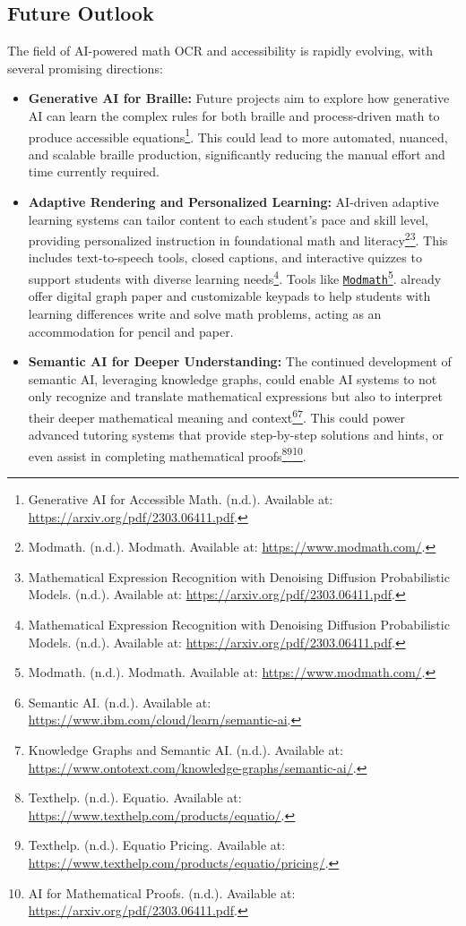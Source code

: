\subsection{Future Outlook}
The field of AI-powered math OCR and accessibility is rapidly evolving, with several promising directions:
\begin{itemize}
    \item \textbf{Generative AI for Braille:} Future projects aim to explore how generative AI can learn the complex rules for both braille and process-driven math to produce accessible equations\footnote{Generative AI for Accessible Math. (n.d.). Available at: \url{https://arxiv.org/pdf/2303.06411.pdf}.}. This could lead to more automated, nuanced, and scalable braille production, significantly reducing the manual effort and time currently required.
    \item \textbf{Adaptive Rendering and Personalized Learning:} AI-driven adaptive learning systems can tailor content to each student's pace and skill level, providing personalized instruction in foundational math and literacy\footnote{Modmath. (n.d.). Modmath. Available at: \url{https://www.modmath.com/}.}\footnote{Mathematical Expression Recognition with Denoising Diffusion Probabilistic Models. (n.d.). Available at: \url{https://arxiv.org/pdf/2303.06411.pdf}.}. This includes text-to-speech tools, closed captions, and interactive quizzes to support students with diverse learning needs\footnote{Mathematical Expression Recognition with Denoising Diffusion Probabilistic Models. (n.d.). Available at: \url{https://arxiv.org/pdf/2303.06411.pdf}.}. Tools like \href{https://www.modmath.com/}{\texttt{Modmath}}\footnote{Modmath. (n.d.). Modmath. Available at: \url{https://www.modmath.com/}.}. already offer digital graph paper and customizable keypads to help students with learning differences write and solve math problems, acting as an accommodation for pencil and paper.
    \item \textbf{Semantic AI for Deeper Understanding:} The continued development of semantic AI, leveraging knowledge graphs, could enable AI systems to not only recognize and translate mathematical expressions but also to interpret their deeper mathematical meaning and context\footnote{Semantic AI. (n.d.). Available at: \url{https://www.ibm.com/cloud/learn/semantic-ai}.}\footnote{Knowledge Graphs and Semantic AI. (n.d.). Available at: \url{https://www.ontotext.com/knowledge-graphs/semantic-ai/}.}. This could power advanced tutoring systems that provide step-by-step solutions and hints, or even assist in completing mathematical proofs\footnote{Texthelp. (n.d.). Equatio. Available at: \url{https://www.texthelp.com/products/equatio/}.}\footnote{Texthelp. (n.d.). Equatio Pricing. Available at: \url{https://www.texthelp.com/products/equatio/pricing/}.}\footnote{AI for Mathematical Proofs. (n.d.). Available at: \url{https://arxiv.org/pdf/2303.06411.pdf}.}.

\end{itemize}
